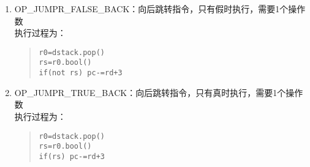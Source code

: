\begin{enumerate}
\item OP\_JUMPR\_FALSE\_BACK：向后跳转指令，只有假时执行，需要1个操作数 \\
执行过程为：
\begin{quote}
\begin{verbatim}
r0=dstack.pop()
rs=r0.bool()
if(not rs) pc-=rd+3
\end{verbatim}
\end{quote}

\item OP\_JUMPR\_TRUE\_BACK：向后跳转指令，只有真时执行，需要1个操作数 \\
执行过程为：
\begin{quote}
\begin{verbatim}
r0=dstack.pop()
rs=r0.bool()
if(rs) pc-=rd+3
\end{verbatim}
\end{quote}
\end{enumerate}